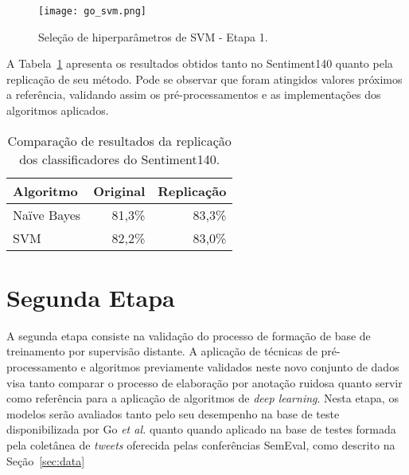 \begin{figure}
\begin{center} {
    \begin{center}
    \texttt{[image: go\_svm.png]}
    \caption{Seleção de hiperparâmetros de SVM - Etapa 1.}
    \label{fig:go_svm}
    \end{center}
}
\end{center}
\end{figure}

A Tabela~\ref{tab:go_compara} apresenta os resultados obtidos tanto no Sentiment140 quanto pela replicação de
seu método.
Pode se observar que foram atingidos valores próximos a referência, validando assim os pré-processamentos e as
implementações dos algoritmos aplicados.

\begin{table}[h]
    \begin{center}
        \begin{tabular}{| l | r | r |}
        \hline
        \textbf{Algoritmo} & \textbf{Original} & \textbf{Replicação} \\ \hline
        Naïve Bayes & 81,3\% & 83,3\% \\ \hline
        SVM &  82,2\% & 83,0\% \\ \hline
        \end{tabular}
        \caption{Comparação de resultados da replicação dos classificadores do Sentiment140.}
        \label{tab:go_compara}
    \end{center}
\end{table}

\section{Segunda Etapa}

A segunda etapa consiste na validação do processo de formação de base de treinamento por supervisão distante.
A aplicação de técnicas de pré-processamento e algoritmos previamente validados neste novo conjunto de dados visa tanto
comparar o processo de elaboração por anotação ruidosa quanto servir como referência para a aplicação de algoritmos de
\textit{deep learning}.
Nesta etapa, os modelos serão avaliados tanto pelo seu desempenho na base de teste disponibilizada por Go
\textit{et al.} quanto quando aplicado na base de testes formada pela coletânea de \textit{tweets} oferecida pelas
conferências SemEval, como descrito na Seção~\ref{sec:data}


